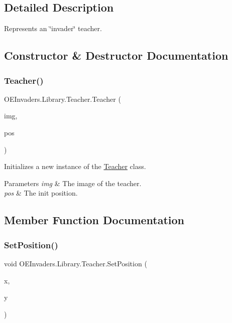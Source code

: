 \subsection{Detailed Description}
Represents an \char`\"{}invader\char`\"{} teacher. 



\subsection{Constructor \& Destructor Documentation}
\mbox{\label{class_o_e_invaders_1_1_library_1_1_teacher_a1498608efc14782423937fe5ac3b7029}} 
\subsubsection{\texorpdfstring{Teacher()}{Teacher()}}
{\footnotesize\ttfamily O\+E\+Invaders.\+Library.\+Teacher.\+Teacher (\begin{DoxyParamCaption}\item[{Bitmap\+Source}]{img,  }\item[{Point}]{pos }\end{DoxyParamCaption})}



Initializes a new instance of the \mbox{\hyperlink{class_o_e_invaders_1_1_library_1_1_teacher}{Teacher}} class. 


\begin{DoxyParams}{Parameters}
{\em img} & The image of the teacher.\\
\hline
{\em pos} & The init position.\\
\hline
\end{DoxyParams}


\subsection{Member Function Documentation}
\mbox{\label{class_o_e_invaders_1_1_library_1_1_teacher_a5ee45609f0cead5d7aad77b20c5c7be0}} 
\subsubsection{\texorpdfstring{SetPosition()}{SetPosition()}}
{\footnotesize\ttfamily void O\+E\+Invaders.\+Library.\+Teacher.\+Set\+Position (\begin{DoxyParamCaption}\item[{double}]{x,  }\item[{double}]{y }\end{DoxyParamCaption})}



